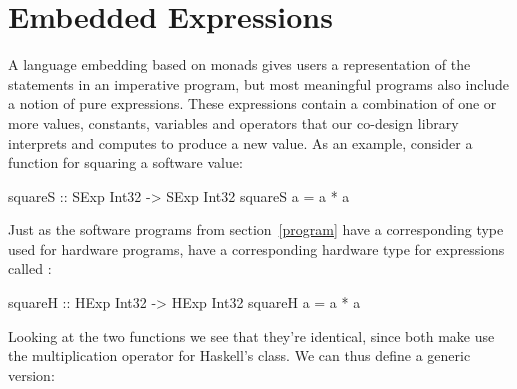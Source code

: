 \documentclass[../main.tex]{subfiles}
\begin{document}


\section{Embedded Expressions}
\label{expr}

A language embedding based on monads gives users a representation of the statements in an imperative program, but most meaningful programs also include a notion of pure expressions. These expressions contain a combination of one or more values, constants, variables and operators that our co-design library interprets and computes to produce a new value. As an example, consider a function for squaring a software value:

\begin{code}
squareS :: SExp Int32 -> SExp Int32
squareS a = a * a
\end{code}


Just as the software programs from section~\ref{program} have a corresponding type used for hardware programs,  have a corresponding hardware type for expressions called :


\begin{stub}
squareH :: HExp Int32 -> HExp Int32
squareH a = a * a
\end{stub}

Looking at the two functions we see that they're identical, since both make use the multiplication operator for Haskell's  class. We can thus define a generic version:

\end{document}
